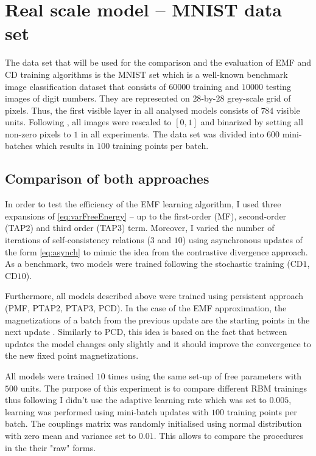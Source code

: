 \section{Real scale model -- MNIST data set}
The data set that will be used for the comparison and the evaluation of EMF and CD training algorithms is the MNIST set \cite{lecun1998} which is a well-known benchmark image classification dataset that consists of $60000$ training and $10000$ testing images of digit numbers. They are represented
on $28$-by-$28$ grey-scale grid of pixels. Thus, the first visible layer in all analysed models consists of $784$ visible units. Following \cite{gabrie2015training}, \cite{salakhutdinov2008learning} all images were rescaled to $ \left[ 0, 1 \right]  $ and binarized by setting all non-zero pixels to $1$ in all experiments.
The data set was divided into $600$ mini-batches which results in $100$ training points per batch.

\subsection{Comparison of both approaches}
In order to test the efficiency of the EMF learning algorithm, I used three expansions of \ref{eq:varFreeEnergy} -- up to the first-order (MF), second-order (TAP2) and third order (TAP3) term. Moreover, I varied the number of iterations of self-consistency relations ($3$ and $10$) using asynchronous updates of the form \ref{eq:asynch} to mimic the idea from the contrastive divergence approach. As a benchmark, two models were trained following the stochastic training (CD$1$, CD$10$).

Furthermore, all models described above were trained using persistent approach (PMF, PTAP2, PTAP3, PCD). In the case of the EMF approximation, the magnetizations of a batch  from the previous update are the starting points in the next update \cite{gabrie2015training}. Similarly to PCD, this idea is based on the fact that between updates the model changes only slightly and it should improve the convergence to the new fixed point magnetizations.

All models were trained $10$ times using the same set-up of free parameters with $500$ units. The purpose of this experiment is to compare different RBM trainings thus following \cite{gabrie2015training} I didn't use the adaptive learning rate which was set to $0.005$, learning was performed using mini-batch updates with $100$ training points per batch. The couplings matrix was randomly initialised using normal distribution with zero mean and variance set to $0.01$. This allows to compare the procedures in the their "raw" forms. 

